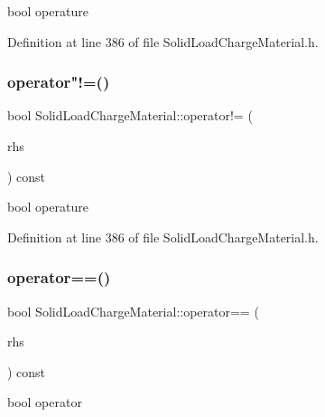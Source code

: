 bool operature 

Definition at line 386 of file Solid\+Load\+Charge\+Material.\+h.

\mbox{\label{class_solid_load_charge_material_abb07f23a4dc3bfacabd2080b14034248}} 
\subsubsection{\texorpdfstring{operator"!=()}{operator!=()}\hspace{0.1cm}{\footnotesize\ttfamily [3/3]}}
{\footnotesize\ttfamily bool Solid\+Load\+Charge\+Material\+::operator!= (\begin{DoxyParamCaption}\item[{const \hyperlink{class_solid_load_charge_material}{Solid\+Load\+Charge\+Material} \&}]{rhs }\end{DoxyParamCaption}) const\hspace{0.3cm}{\ttfamily [inline]}}

bool operature 

Definition at line 386 of file Solid\+Load\+Charge\+Material.\+h.

\mbox{\label{class_solid_load_charge_material_aacf2f41ce38067a52fb7d8456a05a699}} 
\subsubsection{\texorpdfstring{operator==()}{operator==()}\hspace{0.1cm}{\footnotesize\ttfamily [1/3]}}
{\footnotesize\ttfamily bool Solid\+Load\+Charge\+Material\+::operator== (\begin{DoxyParamCaption}\item[{const \hyperlink{class_solid_load_charge_material}{Solid\+Load\+Charge\+Material} \&}]{rhs }\end{DoxyParamCaption}) const\hspace{0.3cm}{\ttfamily [inline]}}

bool operator 


